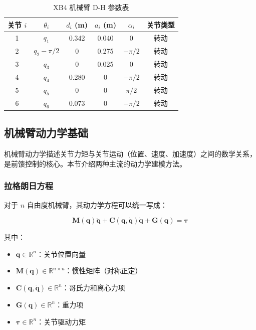 \documentclass[12pt,a4paper,oneside]{article}
\numberwithin{equation}{section}
\newcommand{\bb}[1]{\mathbf{#1}}
\begin{document}
\begin{table}[H]
    \centering
    \caption{XB4 机械臂 D-H 参数表}
    \begin{tabular}{cccccc}
        \toprule
        \textbf{关节 $i$} & $\theta_i$ & $d_i$ (m) & $a_i$ (m) & $\alpha_i$ & \textbf{关节类型} \\
        \midrule
        1 & $q_1$        & 0.342 & 0.040 & $0$        & 转动 \\
        2 & $q_2 - \pi/2$ & $0$   & 0.275 & $-\pi/2$   & 转动 \\
        3 & $q_3$        & $0$   & 0.025 & $0$        & 转动 \\
        4 & $q_4$        & 0.280 & $0$   & $-\pi/2$   & 转动 \\
        5 & $q_5$        & $0$   & $0$   & $\pi/2$    & 转动 \\
        6 & $q_6$        & 0.073 & $0$   & $-\pi/2$   & 转动 \\
        \bottomrule
    \end{tabular}
\end{table}

\subsection{机械臂动力学基础}

机械臂动力学描述关节力矩与关节运动（位置、速度、加速度）之间的数学关系，
是前馈控制的核心。本节介绍两种主流的动力学建模方法。

\subsubsection{拉格朗日方程}

对于 $n$ 自由度机械臂，其动力学方程可以统一写成：

\begin{equation}
    \bb{M}(\bb{q})\ddot{\bb{q}} + \bb{C}(\bb{q},\dot{\bb{q}})\dot{\bb{q}} + \bb{G}(\bb{q}) = \bb{\tau}
    \label{eq:robot_dynamics}
\end{equation}

其中：

\begin{itemize}
    \item $\bb{q} \in \mathbb{R}^n$：关节位置向量
    \item $\bb{M}(\bb{q}) \in \mathbb{R}^{n \times n}$：惯性矩阵（对称正定）
    \item $\bb{C}(\bb{q},\dot{\bb{q}}) \in \mathbb{R}^n$：哥氏力和离心力项
    \item $\bb{G}(\bb{q}) \in \mathbb{R}^n$：重力项
    \item $\bb{\tau} \in \mathbb{R}^n$：关节驱动力矩
\end{itemize}
\end{document}
